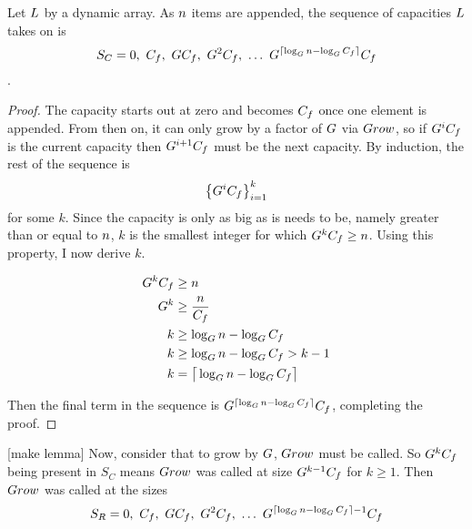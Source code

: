 \begin{lemma}
\label{CapacitySequence}
	Let $L$ by a dynamic array. As $n$ items are appended, the sequence of capacities $L$ takes on is $$S_C = 0,\ \initcapacity,\ \growthfactor\initcapacity,\ \growthfactor^2\initcapacity,\ \ldots\ \growthfactor^{\lceil \log_{\growthfactor} \varnitems - \log_{\growthfactor} \initcapacity \rceil}\initcapacity$$.
\end{lemma}

\begin{proof}
	The capacity starts out at zero and becomes $C_f$ once one element is appended. From then on, it can only grow by a factor of $G$ via $Grow$, so if $G^iC_f$ is the current capacity then $G^{i + 1}C_f$ must be the next capacity. By induction, the rest of the sequence is $$\left\{ G^iC_f \right\}_{i = 1}^k$$ for some $k$. Since the capacity is only as big as is needs to be, namely greater than or equal to $n$, $k$ is the smallest integer for which $G^kC_f \geq n$. Using this property, I now derive $k$.
	
	\begin{align*}
	G^kC_f &\geq n\\
	G^k &\geq \frac{n}{C_f}\\
	k &\geq \log_{G} n - \log_{G} C_f\\
	k &\geq \log_{G} n - \log_{G} C_f > k - 1\\
	k &= \big\lceil \log_{G} n - \log_{G} C_f \big\rceil
	\end{align*}
	
	Then the final term in the sequence is $G^{\lceil \log_{G} n - \log_{G} C_f \rceil}C_f$, completing the proof.
\end{proof}

[make lemma]
Now, consider that to grow by $G$, $Grow$ must be called. So $G^kC_f$ being present in $S_C$ means $Grow$ was called at size $G^{k - 1}C_f$ for $k \geq 1$. Then $Grow$ was called at the sizes $$S_R = 0,\ \initcapacity,\ \growthfactor\initcapacity,\ \growthfactor^2\initcapacity,\ \ldots\ \growthfactor^{\lceil \log_{\growthfactor} \varnitems - \log_{\growthfactor} \initcapacity \rceil - 1}\initcapacity$$

